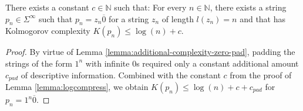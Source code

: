 \begin{corollary}
	\label{cor:log-compressible-zero-pad}
	There exists a constant $c\in\mathbb{N}$ such that:
	For every $n\in\mathbb{N}$, there exists a string $p_n\in\Sigma^{\infty}$ such that $p_n=z_n\overline{0}$ for a string $z_n$ of length $l(z_n)=n$ and that has Kolmogorov complexity $K(p_n)\leq \log (n) + c$.
\end{corollary}
\begin{proof}
	By virtue of Lemma \ref{lemma:additional-complexity-zero-pad}, padding the strings of the form $1^{n}$ with infinite $0$s required only a constant additional amount $c_{pad}$ of descriptive information.
	Combined with the constant $c$ from the proof of Lemma \ref{lemma:logcompress}, we obtain $K(p_n)\leq \log(n) + c + c_{pad}$ for $p_n=1^n\overline{0}$.
\end{proof}

